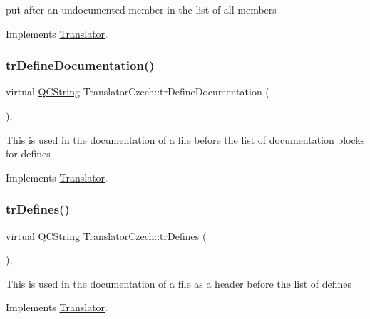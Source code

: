 put after an undocumented member in the list of all members 

Implements \mbox{\hyperlink{class_translator}{Translator}}.

\mbox{\label{class_translator_czech_af71c063700777c4732534eaa3a426b1c}} 
\subsubsection{\texorpdfstring{trDefineDocumentation()}{trDefineDocumentation()}}
{\footnotesize\ttfamily virtual \mbox{\hyperlink{class_q_c_string}{Q\+C\+String}} Translator\+Czech\+::tr\+Define\+Documentation (\begin{DoxyParamCaption}{ }\end{DoxyParamCaption})\hspace{0.3cm}{\ttfamily [inline]}, {\ttfamily [virtual]}}

This is used in the documentation of a file before the list of documentation blocks for defines 

Implements \mbox{\hyperlink{class_translator}{Translator}}.

\mbox{\label{class_translator_czech_adbaaf4e7cde202d9730a803bce37b4bc}} 
\subsubsection{\texorpdfstring{trDefines()}{trDefines()}}
{\footnotesize\ttfamily virtual \mbox{\hyperlink{class_q_c_string}{Q\+C\+String}} Translator\+Czech\+::tr\+Defines (\begin{DoxyParamCaption}{ }\end{DoxyParamCaption})\hspace{0.3cm}{\ttfamily [inline]}, {\ttfamily [virtual]}}

This is used in the documentation of a file as a header before the list of defines 

Implements \mbox{\hyperlink{class_translator}{Translator}}.

\mbox{\label{class_translator_czech_a1167f69c1226e098756566531f178695}} 
